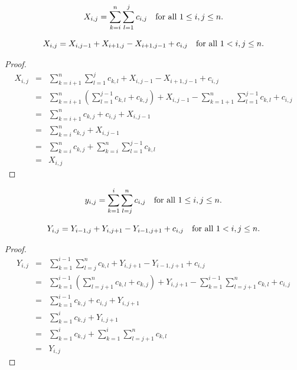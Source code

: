 \documentclass[AMA,LATO1COL]{WileyNJD-v2}
\begin{document}
\begin{definition}
\begin{equation}
X_{i,j}=\sum_{k=i}^{n}\sum_{l=1}^{j}c_{i,j}\mbox{\quad for all $1\leq i,j\leq n$}.
\end{equation}
\end{definition}

\begin{lemma}
\begin{equation}
X_{i,j}=X_{i,j-1}+X_{i+1,j}-X_{i+1,j-1}+c_{i,j} \mbox{\quad for all $1<i,j\leq n$}.
\end{equation}
\end{lemma}

\begin{proof}
\begin{eqnarray*}
X_{i,j}& = & \sum_{k=i+1}^{n}\sum_{l=1}^{j}c_{k,l}+X_{i,j-1}-X_{i+1,j-1}+c_{i,j}\\
 & = & \sum_{k=i+1}^{n}\left(\sum_{l=1}^{j-1}c_{k,l}+c_{k,j}\right)+X_{i,j-1}-\sum_{k=1+1}^{n}\sum_{l=1}^{j-1}c_{k,l}+c_{i,j}\\
 & = & \sum_{k=i+1}^{n}c_{k,j}+c_{i,j}+X_{i,j-1}\\
 & = & \sum_{k=i}^{n}c_{k,j}+X_{i,j-1}\\
 & = & \sum_{k=i}^{n}c_{k,j}+\sum_{k=i}^{n}\sum_{l=1}^{j-1}c_{k,l}\\
 & = & X_{i,j}
\end{eqnarray*}
\end{proof}

\begin{definition}
\begin{equation}
y_{i,j}=\sum_{k=1}^{i}\sum_{l=j}^{n}c_{i,j}\mbox{\quad for all $1\leq i,j\leq n$}.
\end{equation}
\end{definition}

\begin{lemma}
\begin{equation}
Y_{i,j}=Y_{i-1,j}+Y_{i,j+1}-Y_{i-1,j+1}+c_{i,j} \mbox{\quad for all $1<i,j\leq n$}.
\end{equation}
\end{lemma}

\begin{proof}
\begin{eqnarray*}
Y_{i,j}& = & \sum_{k=1}^{i-1}\sum_{l=j}^{n}c_{k,l}+Y_{i,j+1}-Y_{i-1,j+1}+c_{i,j}\\
 & = & \sum_{k=1}^{i-1}\left(\sum_{l=j+1}^{n}c_{k,l}+c_{k,j}\right)+Y_{i,j+1}-\sum_{k=1}^{i-1}\sum_{l=j+1}^{n}c_{k,l}+c_{i,j}\\
 & = & \sum_{k=1}^{i-1}c_{k,j}+c_{i,j}+Y_{i,j+1}\\
 & = & \sum_{k=1}^{i}c_{k,j}+Y_{i,j+1}\\
 & = & \sum_{k=1}^{i}c_{k,j}+\sum_{k=1}^{i}\sum_{l=j+1}^{n}c_{k,l}\\
 & = & Y_{i,j}
\end{eqnarray*}
\end{proof}
\end{document}
